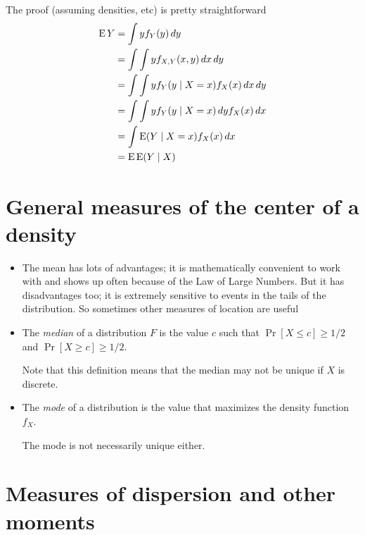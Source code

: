 \begin{itemize}
\begin{enumerate}
\begin{thm}
    \end{thm}
    The proof (assuming densities, etc) is pretty straightforward
    \begin{align*}
      \operatorname{E} Y &= \int y f_Y(y) \,dy \\
      &= \int \int y f_{X,Y}(x,y) \,dx \,dy \\
      &= \int \int y f_Y(y \mid X = x) f_X(x) \,dx \,dy \\
      &= \int \int y f_Y(y \mid X = x) \,dy f_X(x) \,dx \\
      &= \int \operatorname{E}(Y \mid X = x) f_X(x) \,dx \\
      &= \operatorname{E} \operatorname{E}(Y \mid X)
    \end{align*}
  \end{enumerate}

\end{itemize}

\section{General measures of the center of a density}

\begin{itemize}

\item The mean has lots of advantages; it is mathematically convenient
  to work with and shows up often because of the Law of Large Numbers.
  But it has disadvantages too; it is extremely sensitive to events in
  the tails of the distribution.  So sometimes other measures of
  location are useful

\item %
  \begin{defn}
    The \emph{median} of a distribution $F$ is the value $c$ such that
    $\Pr[X \leq c] \geq 1/2$ and $\Pr[X \geq c] \geq 1/2$.
  \end{defn}
  Note that this definition means that the median may not be unique if
  $X$ is discrete.

\item %
  \begin{defn}
    The \emph{mode} of a distribution is the value that maximizes
    the density function $f_X$.
  \end{defn}
  The mode is not necessarily unique either.

\end{itemize}

\section{Measures of dispersion and other moments}

